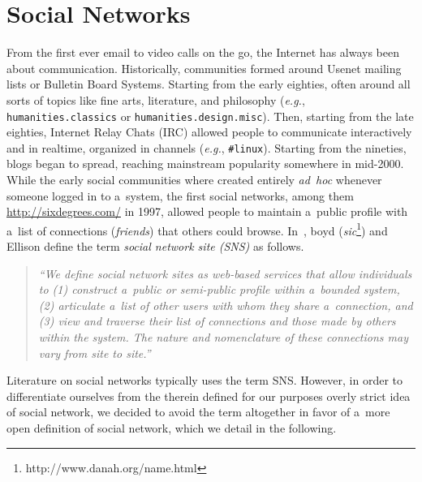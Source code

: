\chapter{Social Networks}
\label{cha:social-networks}

\ifpdf
    \graphicspath{{3_social_networks/figures/PNG/}{3_social_networks/figures/PDF/}{3_social_networks/figures/}}
\else
    \graphicspath{{3_social_networks/figures/EPS/}{3_social_networks/figures/}}
\fi

From the first ever email to video calls on the go,
the Internet has always been about communication.
Historically, communities formed around Usenet mailing lists or Bulletin Board Systems.
Starting from the early eighties,
often around all sorts of topics like fine arts,
literature, and philosophy (\emph{e.g.}, \texttt{humanities.classics}
or \texttt{humanities.\-design.misc}).
Then, starting from the late eighties, Internet Relay Chats (IRC)
allowed people to communicate interactively and in realtime,
organized in channels (\emph{e.g.}, \texttt{\#linux}).
Starting from the nineties, blogs began to spread,
reaching mainstream popularity somewhere in mid-2000.
While the early social communities
where created entirely \emph{ad~hoc}
whenever someone logged in to a~system,
the first social networks,
among them \url{http://sixdegrees.com/} in 1997,
allowed people to maintain a~public profile
with a~list of connections (\emph{friends})
that others could browse.
In~\cite{boyd2007socialnetworksites}, boyd
(\emph{sic}\footnote{http://www.danah.org/name.html})
and Ellison define the term
\emph{social network site (SNS)} as follows.

\begin{quotation}
  \textit{``We define social network sites as web-based services
  that allow individuals to
  (1) construct a~public or
  semi-public profile within a~bounded system,
  (2) articulate a~list of other users
  with whom they share a~connection, and
  (3) view and traverse their list of connections
  and those made by others within the system.
  The nature and nomenclature of these connections
  may vary from site to site.''}
\end{quotation}

Literature on social networks typically uses the term SNS.
However, in order to differentiate ourselves
from the therein defined for our purposes overly strict
idea of social network,
we decided to avoid the term altogether in favor of a~more open
definition of social network,
which we detail in the following. 

